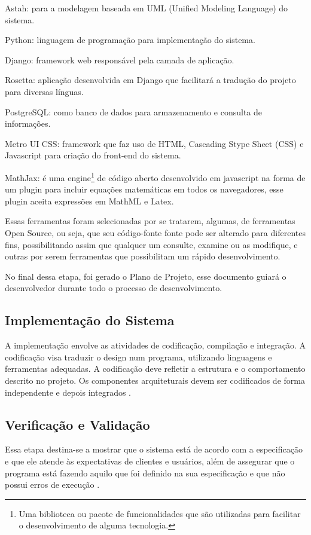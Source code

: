 \begin{alineas}
	\item Astah: para a modelagem baseada em UML (Unified Modeling Language) do sistema.
	\item Python: linguagem de programação para implementação do sistema.
    \item Django: framework web responsável pela camada de aplicação.
    \item Rosetta: aplicação desenvolvida em Django que facilitará a tradução do projeto para diversas línguas.  
    \item PostgreSQL: como banco de dados para armazenamento e consulta de informações.
    \item Metro UI CSS: framework que faz uso de HTML, Cascading Stype Sheet (CSS) e Javascript para criação do front-end do sistema.
    \item MathJax: \'e uma engine\footnote{Uma biblioteca ou pacote de funcionalidades que são utilizadas para facilitar o desenvolvimento de alguma tecnologia.} de código aberto desenvolvido em 
javascript na forma de um plugin para incluir equações matemáticas em todos os navegadores, esse plugin aceita expressões em  MathML e Latex.

\end{alineas}

Essas ferramentas foram selecionadas por se tratarem, algumas, de ferramentas Open Source, ou seja, que seu código-fonte fonte pode ser alterado para diferentes fins, possibilitando assim que qualquer um consulte, examine ou as modifique, e outras por serem ferramentas que possibilitam um rápido desenvolvimento.

No final dessa etapa, foi gerado o Plano de Projeto, esse documento guiar\'a o desenvolvedor durante 
todo o processo de desenvolvimento.

\subsection{Implementação do Sistema}

A implementação envolve as atividades de codificação, compilação e integração. A codificação visa traduzir o design num programa, utilizando linguagens e  ferramentas adequadas. A codificação deve 
refletir a estrutura e o comportamento descrito no projeto. Os componentes arquiteturais devem ser codificados de forma independente e depois integrados \cite{aguiar2012requisitos}.

\subsection{Verificação e Validação}
Essa etapa destina-se a mostrar que o sistema está de acordo com a especificação 
e que ele atende às expectativas de clientes e usuários,  al\'em de assegurar 
que o  programa está fazendo aquilo que foi definido na sua especificação e que não 
possui  erros  de  execução \cite{aguiar2012requisitos}. 

